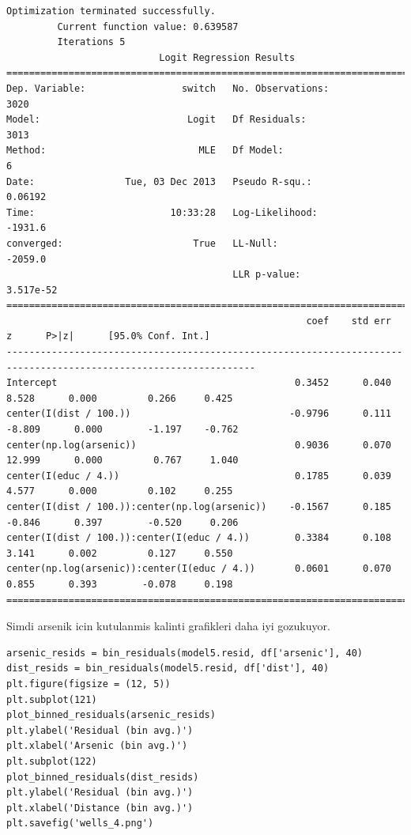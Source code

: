 \documentclass[12pt,fleqn]{article}\usepackage{../common}
\begin{document}
\begin{verbatim}
Optimization terminated successfully.
         Current function value: 0.639587
         Iterations 5
                           Logit Regression Results                           
==============================================================================
Dep. Variable:                 switch   No. Observations:                 3020
Model:                          Logit   Df Residuals:                     3013
Method:                           MLE   Df Model:                            6
Date:                Tue, 03 Dec 2013   Pseudo R-squ.:                 0.06192
Time:                        10:33:28   Log-Likelihood:                -1931.6
converged:                       True   LL-Null:                       -2059.0
                                        LLR p-value:                 3.517e-52
==================================================================================================================
                                                     coef    std err          z      P>|z|      [95.0% Conf. Int.]
------------------------------------------------------------------------------------------------------------------
Intercept                                          0.3452      0.040      8.528      0.000         0.266     0.425
center(I(dist / 100.))                            -0.9796      0.111     -8.809      0.000        -1.197    -0.762
center(np.log(arsenic))                            0.9036      0.070     12.999      0.000         0.767     1.040
center(I(educ / 4.))                               0.1785      0.039      4.577      0.000         0.102     0.255
center(I(dist / 100.)):center(np.log(arsenic))    -0.1567      0.185     -0.846      0.397        -0.520     0.206
center(I(dist / 100.)):center(I(educ / 4.))        0.3384      0.108      3.141      0.002         0.127     0.550
center(np.log(arsenic)):center(I(educ / 4.))       0.0601      0.070      0.855      0.393        -0.078     0.198
==================================================================================================================
\end{verbatim}

Simdi arsenik icin kutulanmis kalinti grafikleri daha iyi gozukuyor.

\begin{verbatim}
arsenic_resids = bin_residuals(model5.resid, df['arsenic'], 40)
dist_resids = bin_residuals(model5.resid, df['dist'], 40)
plt.figure(figsize = (12, 5))
plt.subplot(121)
plot_binned_residuals(arsenic_resids)
plt.ylabel('Residual (bin avg.)')
plt.xlabel('Arsenic (bin avg.)')
plt.subplot(122)
plot_binned_residuals(dist_resids)
plt.ylabel('Residual (bin avg.)')
plt.xlabel('Distance (bin avg.)')
plt.savefig('wells_4.png')
\end{verbatim}
\end{document}
